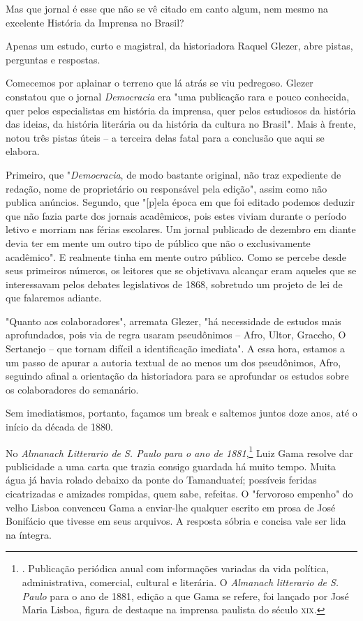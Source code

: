 Mas que jornal é esse que não se vê citado em canto algum, nem mesmo na
excelente História da Imprensa no Brasil?

Apenas um estudo, curto e magistral, da historiadora Raquel Glezer, abre
pistas, perguntas e respostas.

Comecemos por aplainar o terreno que lá atrás se viu pedregoso. Glezer
constatou que o jornal \emph{Democracia} era "uma publicação rara e
pouco conhecida, quer pelos especialistas em história da imprensa, quer
pelos estudiosos da história das ideias, da história literária ou da
história da cultura no Brasil". Mais à frente, notou três pistas úteis
-- a terceira delas fatal para a conclusão que aqui se elabora.

Primeiro, que "\emph{Democracia}, de modo bastante original, não traz
expediente de redação, nome de proprietário ou responsável pela edição",
assim como não publica anúncios. Segundo, que "{[}p{]}ela época em que
foi editado podemos deduzir que não fazia parte dos jornais acadêmicos,
pois estes viviam durante o período letivo e morriam nas férias
escolares. Um jornal publicado de dezembro em diante devia ter em mente
um outro tipo de público que não o exclusivamente acadêmico". E
realmente tinha em mente outro público. Como se percebe desde seus
primeiros números, os leitores que se objetivava alcançar eram aqueles
que se interessavam pelos debates legislativos de 1868, sobretudo um
projeto de lei de que falaremos adiante.

"Quanto aos colaboradores", arremata Glezer, "há necessidade de estudos
mais aprofundados, pois via de regra usaram pseudônimos -- Afro, Ultor,
Graccho, O Sertanejo -- que tornam difícil a identificação imediata". A
essa hora, estamos a um passo de apurar a autoria textual de ao menos um
dos pseudônimos, Afro, seguindo afinal a orientação da historiadora para
se aprofundar os estudos sobre os colaboradores do semanário.

Sem imediatismos, portanto, façamos um break e saltemos juntos doze
anos, até o início da década de 1880.

No \emph{Almanach Litterario de S. Paulo para o ano de 1881},\footnote{.
  Publicação periódica anual com informações variadas da vida política,
  administrativa, comercial, cultural e literária. O \emph{Almanach
  litterario de S. Paulo} para o ano de 1881, edição a que Gama se
  refere, foi lançado por José Maria Lisboa, figura de destaque na
  imprensa paulista do século \textsc{xix}.} Luiz Gama resolve dar publicidade a
uma carta que trazia consigo guardada há muito tempo. Muita água já
havia rolado debaixo da ponte do Tamanduateí; possíveis feridas
cicatrizadas e amizades rompidas, quem sabe, refeitas. O "fervoroso
empenho" do velho Lisboa convenceu Gama a enviar-lhe qualquer escrito em
prosa de José Bonifácio que tivesse em seus arquivos. A resposta sóbria
e concisa vale ser lida na íntegra.

